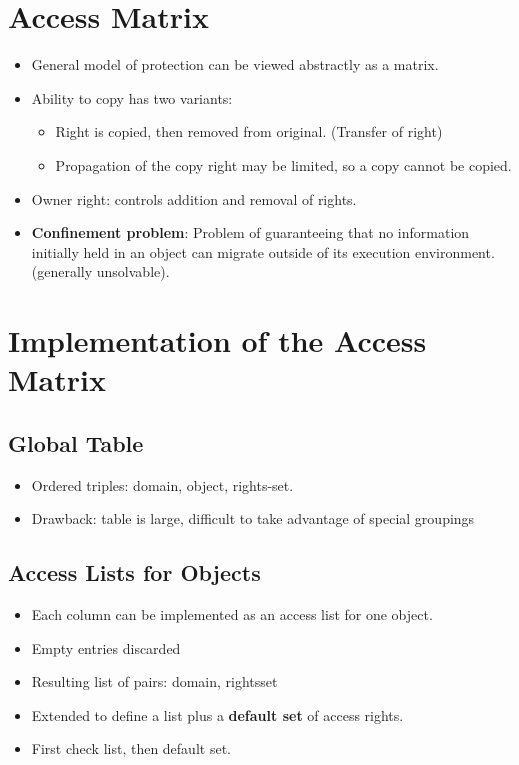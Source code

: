 \documentclass[10pt]{report}
\begin{document}
	\section{Access Matrix}
		\begin{itemize}
			\item General model of protection can be viewed abstractly as a matrix.
			\item Ability to copy has two variants:
			\begin{itemize}
				\item Right is copied, then removed from original. (Transfer of right)
				\item Propagation of the copy right may be limited, so a copy cannot be copied.
			\end{itemize}
			\item Owner right: controls addition and removal of rights.
			\item \textbf{Confinement problem}: Problem of guaranteeing that no information initially held in an object can migrate outside of its execution environment. (generally unsolvable).
		\end{itemize}

	\section{Implementation of the Access Matrix}
		\subsection{Global Table}
			\begin{itemize}
				\item Ordered triples: domain, object, rights-set.
				\item Drawback: table is large, difficult to take advantage of special groupings
			\end{itemize}

		\subsection{Access Lists for Objects}
			\begin{itemize}
				\item Each column can be implemented as an access list for one object.
				\item Empty entries discarded
				\item Resulting list of pairs: domain, rightsset
				\item Extended to define a list plus a \textbf{default set} of access rights.
				\item First check list, then default set.
			\end{itemize}
\end{document}
